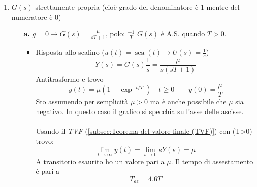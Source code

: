 	\begin{enumerate}
		\item $ G(s) $ strettamente propria (cioè grado del denominatore è 1 mentre del numeratore è 0)
		\begin{enumerate}
			\item[\textbf{a.}] $ g=0 \to G(s) = \frac{\mu}{sT+1}$, polo: $ \frac{-1}{T} $
			$ G(s) $ è A.S. quando $ T>0 $.
			\begin{itemize}
				\item Risposta allo scalino ($ u(t) = \operatorname{sca}(t) \to U(s) = \frac{1}{s} $)
				\begin{equation*}
					Y(s) = G(s) \frac{1}{s} = \frac{\mu}{s(sT+1)}
				\end{equation*}
				Antitrasformo e trovo
				\begin{equation*}
					y(t) = \mu (1-\exp^{-t/T}) \quad t\geq0 \qquad \dot{y}(0) =\frac{\mu}{T}
				\end{equation*}
				Sto assumendo per semplicità $ \mu>0 $ ma è anche possibile che $\mu$ sia negativo. In questo caso il grafico si specchia sull'asse delle ascisse.\\\\
				Usando il \emph{TVF} (\cref*{subsec:Teorema del valore finale (TVF)}) con (T>0) trovo:
				\begin{equation*}
					\displaystyle\lim_{t\to\infty} y(t) = \lim_{s\to0} sY(s) = \mu
				\end{equation*}
				A transitorio esaurito ho un valore pari a $\mu$. Il tempo di assestamento è pari a 
				\begin{equation*}
					T_{a\epsilon} =4.6T 
				\end{equation*}

\end{itemize}
\end{enumerate}
\end{enumerate}
